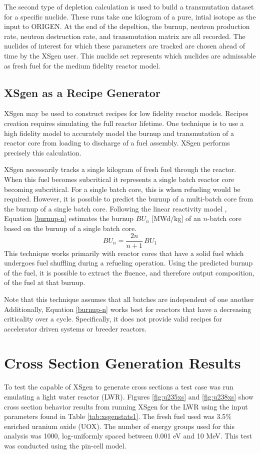 \documentclass{article}
\begin{document}
The second type of depletion calculation is used to build a transmutation dataset for a
specific nuclide. These runs take one kilogram of a pure, intial isotope as the input to
ORIGEN. At the end of the depeltion, the burnup, neutron production rate, neutron
destruction rate, and transmutation matrix are all recorded. The nuclides of interest
for which these parameters are tracked are chosen ahead of time by the XSgen user.
This nuclide set represents which nuclides are admissable as fresh fuel for the medium
fidelity reactor model.

\subsection{XSgen as a Recipe Generator}
XSgen may be used to construct recipes for low fidelity reactor models. Recipes creation
requires simulating the full reactor lifetime. One technique is to use a high fidelity
model to accurately model the burnup and transmutation of a reactor core from loading to
discharge of a fuel assembly. XSgen performs precisely this calculation.

XSgen necessarily tracks a single kilogram of fresh fuel through the reactor. When this
fuel becomes subcritical it represents a single batch reactor core becoming subcritical.
For a single batch core, this is when refueling would be required. However, it is possible
to predict the burnup of a multi-batch core from the burnup of a single batch core.
Following the linear reactivity model \cite{linear}, Equation \ref{burnup-n} estimates the burnup
$BU_n$ [MWd/kg] of an $n$-batch core based on the burnup of a single batch core.
\begin{equation}
\label{burnup-n}
BU_n = \frac{2n}{n+1} \, BU_1
\end{equation}
This technique works primarily with reactor cores that have a solid fuel which undergoes
fuel shuffling during a refueling operation. Using the predicted burnup of the fuel,
it is possible to extract the fluence, and therefore output composition,
of the fuel at that burnup\cite{brightlite}\cite{linear}. 

Note that this technique assumes that all batches are independent of one another
Additionally, Equation \ref{burnup-n} works best for reactors that have a decreasing
criticality over a cycle. Specifically, it does not provide valid recipes for accelerator
driven systems or breeder reactors.

\section{Cross Section Generation Results}
To test the capable of XSgen to generate cross sections a test case was run emulating a light water reactor (LWR). 
Figures \ref{fig:u235xs} and \ref{fig:u238xs} show cross section behavior results
from running XSgen for the LWR using the input parameters found in
Table \ref{tab:xsgenstats1}. The fresh fuel used was 3.5\% enriched uranium oxide (UOX).
The number of energy groups used for this analysis was 1000, log-uniformly spaced between
0.001 eV and 10 MeV. This test was conducted using the pin-cell model\cite{pin-cell}. 
\end{document}
